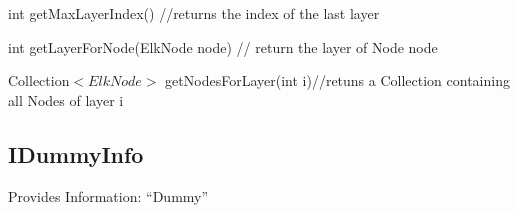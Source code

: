 \begin{list}{}{Functions:}
\item int getMaxLayerIndex() //returns the index of the last layer
\item int getLayerForNode(ElkNode node) // return the layer of Node node
\item Collection$<ElkNode>$ getNodesForLayer(int i)//retuns a Collection containing all Nodes of layer i
\end{list}

\subsection{IDummyInfo}
Provides Information: "`Dummy"'
